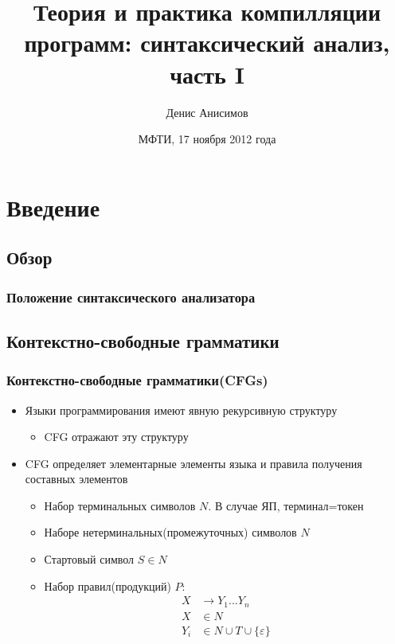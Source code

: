 \documentclass[16pt,pdf,unicode]{beamer}
\title[Синтаксический анализ]{Теория и практика компилляции программ: синтаксический анализ, часть I}
\author[Д. Анисимов]{Денис Анисимов}
\institute[МФТИ]{Московский физико-технический университет\\
	{\tiny государственный университет}\\}
\date[17.11.2012]{МФТИ, 17 ноября 2012 года}
\begin{document}
\begin{frame}[plain]
\setcounter{framenumber}{0}
\titlepage
\end{frame}

\section{Введение}
\subsection{Обзор}
\begin{frame}
\frametitle{Положение синтаксического анализатора}
\begin{figure}
  
\end{figure}
\end{frame}

\subsection{Контекстно-свободные грамматики}
\begin{frame}
\frametitle{Контекстно-свободные грамматики(CFGs)}
\begin{itemize}
  \item Языки программирования имеют явную рекурсивную структуру
  \begin{itemize}
    \item CFG отражают эту структуру
  \end{itemize}
  \item CFG определяет элементарные элементы языка и правила получения составных элементов
  \begin{itemize}
    \item Набор терминальных символов $N$. В случае ЯП, терминал=токен
    \item Наборе нетерминальных(промежуточных) символов $N$
    \item Стартовый символ $S \in N$
    \item Набор правил(продукций) $P$:
      \begin{align*}
        X &\rightarrow Y_1...Y_n \\
        X &\in N \\
        Y_i &\in N \cup T \cup \{\varepsilon\}
      \end{align*}
  \end{itemize}
  \end{itemize}
\end{frame}
\end{document}
